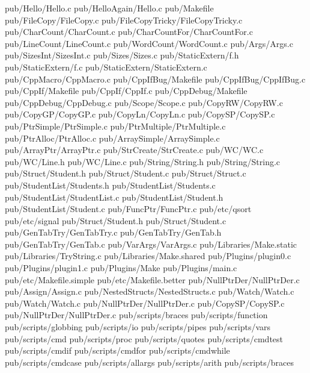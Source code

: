 pub/Hello/Hello.c
pub/HelloAgain/Hello.c
pub/Makefile
pub/FileCopy/FileCopy.c
pub/FileCopyTricky/FileCopyTricky.c
pub/CharCount/CharCount.c
pub/CharCountFor/CharCountFor.c
pub/LineCount/LineCount.c
pub/WordCount/WordCount.c
pub/Args/Args.c
pub/SizesInt/SizesInt.c
pub/Sizes/Sizes.c
pub/StaticExtern/f.h
pub/StaticExtern/f.c
pub/StaticExtern/StaticExtern.c
pub/CppMacro/CppMacro.c
pub/CppIfBug/Makefile
pub/CppIfBug/CppIfBug.c
pub/CppIf/Makefile
pub/CppIf/CppIf.c
pub/CppDebug/Makefile
pub/CppDebug/CppDebug.c
pub/Scope/Scope.c
pub/CopyRW/CopyRW.c
pub/CopyGP/CopyGP.c
pub/CopyLn/CopyLn.c
pub/CopySP/CopySP.c
pub/PtrSimple/PtrSimple.c
pub/PtrMultiple/PtrMultiple.c
pub/PtrAlloc/PtrAlloc.c
pub/ArraySimple/ArraySimple.c
pub/ArrayPtr/ArrayPtr.c
pub/StrCreate/StrCreate.c
pub/WC/WC.c
pub/WC/Line.h
pub/WC/Line.c
pub/String/String.h
pub/String/String.c
pub/Struct/Student.h
pub/Struct/Student.c
pub/Struct/Struct.c
pub/StudentList/Students.h
pub/StudentList/Students.c
pub/StudentList/StudentList.c
pub/StudentList/Student.h
pub/StudentList/Student.c
pub/FuncPtr/FuncPtr.c
pub/etc/qsort
pub/etc/signal
pub/Struct/Student.h
pub/Struct/Student.c
pub/GenTabTry/GenTabTry.c
pub/GenTabTry/GenTab.h
pub/GenTabTry/GenTab.c
pub/VarArgs/VarArgs.c
pub/Libraries/Make.static
pub/Libraries/TryString.c
pub/Libraries/Make.shared
pub/Plugins/plugin0.c
pub/Plugins/plugin1.c
pub/Plugins/Make
pub/Plugins/main.c
pub/etc/Makefile.simple
pub/etc/Makefile.better
pub/NullPtrDer/NullPtrDer.c
pub/Assign/Assign.c
pub/NestedStructs/NestedStructs.c
pub/Watch/Watch.c
pub/Watch/Watch.c
pub/NullPtrDer/NullPtrDer.c
pub/CopySP/CopySP.c
pub/NullPtrDer/NullPtrDer.c
pub/scripts/braces
pub/scripts/function
pub/scripts/globbing
pub/scripts/io
pub/scripts/pipes
pub/scripts/vars
pub/scripts/cmd
pub/scripts/proc
pub/scripts/quotes
pub/scripts/cmdtest
pub/scripts/cmdif
pub/scripts/cmdfor
pub/scripts/cmdwhile
pub/scripts/cmdcase
pub/scripts/allargs
pub/scripts/arith
pub/scripts/braces


